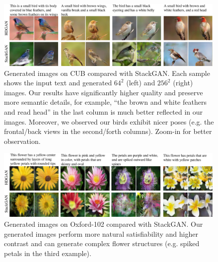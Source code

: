 \documentclass[10pt,twocolumn,letterpaper]{article}
\begin{document}
\begin{figure}[t]
    \centering
    \includegraphics[width=0.99\textwidth]{figure/cub.pdf}
    \vspace{-.2cm}
    \caption{Generated images on CUB compared with StackGAN. Each sample shows the input text and generated $64^2$ (left) and $256^2$ (right) images. Our results have significantly higher quality and preserve more semantic details, for example, ``the brown and white feathers and read head'' in the last column is much better reflected in our images. Moreover, we observed our birds exhibit nicer poses (e.g. the frontal/back views in the second/forth columns). Zoom-in for better observation.}
    \vspace{-0.3cm}
    \label{fig:vis-cub}
\end{figure}
\begin{figure}[t]
    \centering
    \includegraphics[width=0.99\textwidth]{figure/flowers.pdf}
    \vspace{-.2cm}
    \caption{Generated images on Oxford-102 compared with StackGAN. Our generated images perform more natural satisfiability and higher contrast and can generate complex flower structures (e.g. spiked petals in the third example).} \label{fig:vis-oxford}
    \vspace{-.5cm}
\end{figure}
\end{document}

